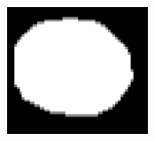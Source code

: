 \begin{frame}
\begin{columns}[b,onlytextwidth]
\begin{column}{.25\textwidth}
\begin{figure}[t]
\centering
\setlength{\fboxrule}{0.1pt}
\setlength{\fboxsep}{0cm}
\end{figure}
\end{column}
\begin{column}{.25\textwidth}
 \begin{figure}[t]
\centering
\includegraphics[height=1.5in]{../../Figures/gac/dcm_out.eps}
\end{figure}
\end{column}
\end{columns}
\end{frame} 

